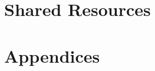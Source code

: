 \documentclass[12pt,a4paper]{report}
\begin{document}
\chapter{Shared Resources}


%
%
%
%
%
%

\chapter{Appendices}
%
%
%
\end{document}
